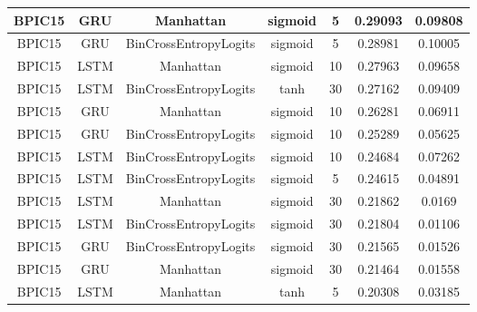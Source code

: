 \documentclass{article}%
\begin{document}
\begin{longtable}{|c|c|c|c|c|c|c|}
\hline%
BPIC15&GRU&Manhattan&sigmoid&5&0.29093&0.09808\\%
\hline%
BPIC15&GRU&BinCrossEntropyLogits&sigmoid&5&0.28981&0.10005\\%
\hline%
BPIC15&LSTM&Manhattan&sigmoid&10&0.27963&0.09658\\%
\hline%
BPIC15&LSTM&BinCrossEntropyLogits&tanh&30&0.27162&0.09409\\%
\hline%
BPIC15&GRU&Manhattan&sigmoid&10&0.26281&0.06911\\%
\hline%
BPIC15&GRU&BinCrossEntropyLogits&sigmoid&10&0.25289&0.05625\\%
\hline%
BPIC15&LSTM&BinCrossEntropyLogits&sigmoid&10&0.24684&0.07262\\%
\hline%
BPIC15&LSTM&BinCrossEntropyLogits&sigmoid&5&0.24615&0.04891\\%
\hline%
BPIC15&LSTM&Manhattan&sigmoid&30&0.21862&0.0169\\%
\hline%
BPIC15&LSTM&BinCrossEntropyLogits&sigmoid&30&0.21804&0.01106\\%
\hline%
BPIC15&GRU&BinCrossEntropyLogits&sigmoid&30&0.21565&0.01526\\%
\hline%
BPIC15&GRU&Manhattan&sigmoid&30&0.21464&0.01558\\%
\hline%
BPIC15&LSTM&Manhattan&tanh&5&0.20308&0.03185\\%
\hline%
\end{longtable}

%
\end{document}
